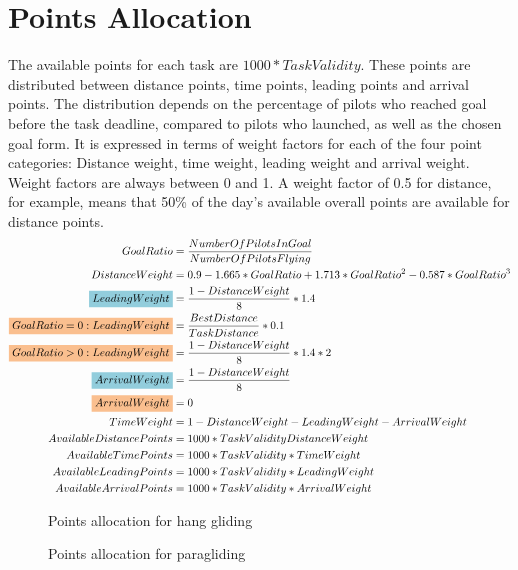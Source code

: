 \documentclass{article}
\begin{document}
\section{Points Allocation}
\label{sec:points-allocation}
The available points for each task are \(1000*TaskValidity\). These points are
distributed between distance points, time points, leading points and arrival
points. The distribution depends on the percentage of pilots who reached goal
before the task deadline, compared to pilots who launched, as well as the
chosen goal form. It is expressed in terms of weight factors for each of the
four point categories: Distance weight, time weight, leading weight and arrival
weight. Weight factors are always between 0 and 1. A weight factor of 0.5 for
distance, for example, means that 50\% of the day’s available overall points
are available for distance points.
\begin{align*}
    GoalRatio &= \frac{NumberOfPilotsInGoal}{NumberOfPilotsFlying} \\
    DistanceWeight &= 0.9 - 1.665 * GoalRatio + 1.713 * GoalRatio^2 - 0.587 * GoalRatio^3 \\
    \hgh{LeadingWeight} &= \frac{1 - DistanceWeight}{8} * 1.4 \\
    \pgh{GoalRatio = 0 : LeadingWeight} &= \frac{BestDistance}{TaskDistance} * 0.1 \\
    \pgh{GoalRatio > 0 : LeadingWeight} &= \frac{1 - DistanceWeight}{8} * 1.4 * 2 \\
    \hgh{ArrivalWeight} &= \frac{1 - DistanceWeight}{8} \\
    \pgh{ArrivalWeight} &= 0 \\
    TimeWeight &= 1 - DistanceWeight - LeadingWeight - ArrivalWeight \\
    AvailableDistancePoints &= 1000 * TaskValidity  DistanceWeight \\
    AvailableTimePoints &= 1000 * TaskValidity * TimeWeight \\
    AvailableLeadingPoints &= 1000 * TaskValidity * LeadingWeight \\
    AvailableArrivalPoints &= 1000 * TaskValidity * ArrivalWeight
\end{align*}

\begin{figure}[h]
    \centering
    
    \caption{Points allocation for hang gliding}
\end{figure}

\begin{figure}[h]
    \centering
    
    \caption{Points allocation for paragliding}
\end{figure}
\end{document}
